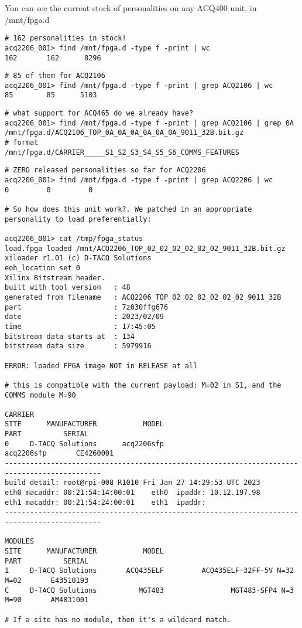 \documentclass[]{article}
\begin{document}
You can see the current stock of personalities on any ACQ400 unit, in /mnt/fpga.d

\begin{lstlisting}[style=bashstyle,frame=single]
# 162 personalities in stock!
acq2206_001> find /mnt/fpga.d -type f -print | wc
162       162      8296
\end{lstlisting}

\begin{lstlisting}[style=bashstyle,frame=single]
# 85 of them for ACQ2106
acq2206_001> find /mnt/fpga.d -type f -print | grep ACQ2106 | wc
85        85      5103
\end{lstlisting}

\begin{lstlisting}[style=bashstyle,frame=single]
# what support for ACQ465 do we already have?
acq2206_001> find /mnt/fpga.d -type f -print | grep ACQ2106 | grep 0A
/mnt/fpga.d/ACQ2106_TOP_0A_0A_0A_0A_0A_0A_9011_32B.bit.gz
# format
/mnt/fpga.d/CARRIER_____S1_S2_S3_S4_S5_S6_COMMS_FEATURES
\end{lstlisting}

\begin{lstlisting}[style=bashstyle,frame=single]
# ZERO released personalities so far for ACQ2206
acq2206_001> find /mnt/fpga.d -type f -print | grep ACQ2206 | wc
0         0         0

# So how does this unit work?. We patched in an appropriate personality to load preferentially:

acq2206_001> cat /tmp/fpga_status
load.fpga loaded /mnt/ACQ2206_TOP_02_02_02_02_02_02_9011_32B.bit.gz
xiloader r1.01 (c) D-TACQ Solutions
eoh_location set 0
Xilinx Bitstream header.
built with tool version   : 48
generated from filename   : ACQ2206_TOP_02_02_02_02_02_02_9011_32B
part                      : 7z030ffg676
date                      : 2023/02/09
time                      : 17:45:05
bitstream data starts at  : 134
bitstream data size       : 5979916

ERROR: loaded FPGA image NOT in RELEASE at all

# this is compatible with the current payload: M=02 in S1, and the COMMS module M=90

CARRIER
SITE      MANUFACTURER           MODEL                                PART          SERIAL
0     D-TACQ Solutions      acq2206sfp                          acq2206sfp       CE4260001
---------------------------------------------------------------------------------------------
build detail: root@rpi-008 R1010 Fri Jan 27 14:29:53 UTC 2023
eth0 macaddr: 00:21:54:14:00:01    eth0  ipaddr: 10.12.197.98
eth1 macaddr: 00:21:54:24:00:01    eth1  ipaddr:
---------------------------------------------------------------------------------------------

MODULES
SITE      MANUFACTURER           MODEL                                PART          SERIAL
1     D-TACQ Solutions       ACQ435ELF         ACQ435ELF-32FF-5V N=32 M=02       E43510193
C     D-TACQ Solutions          MGT483                MGT483-SFP4 N=3 M=90       AM4831001

# If a site has no module, then it's a wildcard match.
\end{lstlisting}
\end{document}
